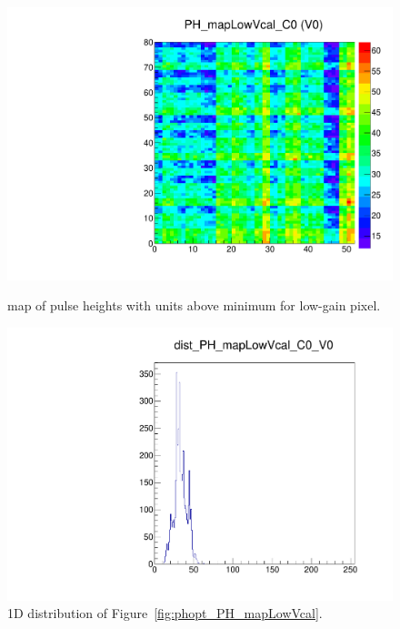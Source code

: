 
\begin{figure}[!htp]
\centering
\begin{minipage}{0.45\textwidth}
  \includegraphics[width=1.0\textwidth]{figures/phopt_PH_mapLowVcal.pdf}
  \caption{\roc map of pulse heights with  units above minimum \vcal for low-gain pixel.}
  \label{fig:phopt_PH_mapLowVcal}
\end{minipage}
\hspace{0.3cm}
\begin{minipage}{0.45\textwidth}
  \includegraphics[width=1.0\textwidth]{figures/phopt_dist_PH_mapLowVcal.pdf}
  \caption{1D distribution of Figure~\ref{fig:phopt_PH_mapLowVcal}.}
  \label{fig:phopt_dist_PH_mapLowVcal}
\end{minipage}
\end{figure}

